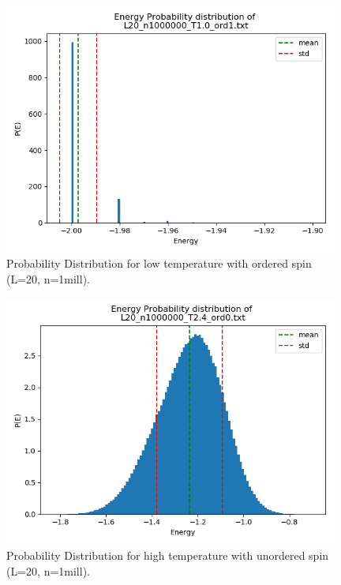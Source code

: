 \documentclass{article}
\begin{document}
  \begin{figure}[ht]
      \centering
      \includegraphics[width = 11cm]{img/energyhistogram_L20_n1000000_T10_ord1.png}
      \caption{Probability Distribution for low temperature with ordered spin (L=20, n=1mill).}
      \label{fig:prob-lowT-ord1}
    \end{figure}

  \begin{figure}[ht]
      \centering
      \includegraphics[width = 11cm]{img/energyhistogram_L20_n1000000_T24_ord0.png}
      \caption{Probability Distribution for high temperature with unordered spin (L=20, n=1mill).}
      \label{fig:prob-highT-ord0}
    \end{figure}
\end{document}
